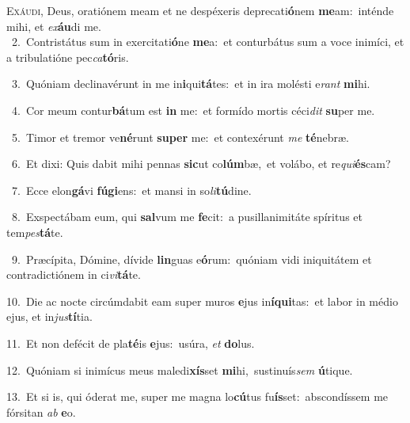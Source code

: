 \lettrine{\initial\textcolor{\initialcolor}{E}}{xáudi,} Deus, oratiónem meam et ne despéxeris deprecati\-\textbf{ó}\-nem \textbf{me}\-am:~\star inténde mihi, et \textit{ex}\-\textbf{áu}di me.\\
{\numbfont\textcolor{\numbcolor}{~2.}}~Contristátus sum in exercitati\-\textbf{ó}\-ne \textbf{me}\-a:~\star et conturbátus sum a voce inimíci, et a tribulatióne pec\-\textit{ca}\-\textbf{tó}ris.\par
{\numbfont\textcolor{\numbcolor}{~3.}}~Quóniam declinavérunt in me in\-\textbf{i}\-qui\-\textbf{tá}\-tes:~\star et in ira molésti e\textit{rant} \textbf{mi}\-hi.\par
{\numbfont\textcolor{\numbcolor}{~4.}}~Cor meum contur\-\textbf{bá}\-tum est \textbf{in} me:~\star et formído mortis céci\textit{dit} \textbf{su}\-per me.\par
{\numbfont\textcolor{\numbcolor}{~5.}}~Timor et tremor ve\-\textbf{né}\-runt \textbf{su}\-\textbf{per} me:~\star et contexérunt \textit{me} \textbf{té}\-nebræ.\par
{\numbfont\textcolor{\numbcolor}{~6.}}~Et dixi: Quis dabit mihi pennas \textbf{sic}\-ut co\-\textbf{lúm}\-bæ,~\star et volábo, et re\-\textit{qui}\-\textbf{és}cam?\par
{\numbfont\textcolor{\numbcolor}{~7.}}~Ecce elon\-\textbf{gá}\-vi \textbf{fú}\-\textbf{gi}ens:~\star et mansi in so\-\textit{li}\-\textbf{tú}dine.\par
{\numbfont\textcolor{\numbcolor}{~8.}}~Exspectábam eum, qui \textbf{sal}\-vum me \textbf{fe}\-cit:~\star a pusillanimitáte spíritus et tem\-\textit{pes}\-\textbf{tá}te.\par
{\numbfont\textcolor{\numbcolor}{~9.}}~Præcípita, Dómine, dívide \textbf{lin}\-guas e\-\textbf{ó}\-rum:~\star quóniam vidi iniquitátem et contradictiónem in ci\-\textit{vi}\-\textbf{tá}te.\par
{\numbfont\textcolor{\numbcolor}{10.}}~Die ac nocte circúmdabit eam super muros \textbf{e}\-jus in\-\textbf{í}\-\textbf{qui}tas:~\star et labor in médio ejus, et in\-\textit{jus}\-\textbf{tí}tia.\par
{\numbfont\textcolor{\numbcolor}{11.}}~Et non defécit de pla\-\textbf{té}\-is \textbf{e}\-jus:~\star usúra, \textit{et} \textbf{do}\-lus.\par
{\numbfont\textcolor{\numbcolor}{12.}}~Quóniam si inimícus meus maledi\-\textbf{xís}\-set \textbf{mi}\-hi,~\star sustinuís\textit{sem} \textbf{ú}\-tique.\par
{\numbfont\textcolor{\numbcolor}{13.}}~Et si is, qui óderat me, super me magna lo\-\textbf{cú}\-tus fu\-\textbf{ís}\-set:~\star abscondíssem me fórsitan \textit{ab} \textbf{e}\-o.\par
